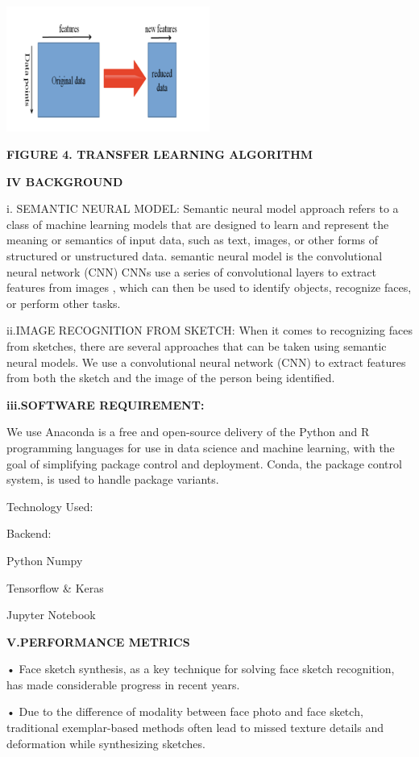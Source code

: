 \documentclass[journal]{IEEEtran} %
\begin{document}
\includegraphics[width=0.5\textwidth]{alg.png}

\textbf\textbf{{\textbf{FIGURE 4. TRANSFER LEARNING ALGORITHM}}
}

\textbf{IV BACKGROUND}

i. SEMANTIC NEURAL MODEL:
Semantic neural model approach refers to a class of machine learning models that are designed to learn and represent the meaning or semantics of input data, such as text, images, or other forms of structured or unstructured data. 
semantic neural model is the convolutional neural network (CNN)  
CNNs use a series of convolutional layers to extract features from images , which can then be used to identify objects, recognize faces, or perform other tasks.

ii.IMAGE RECOGNITION FROM SKETCH:
When it comes to recognizing faces from sketches, there are several approaches that can be taken using semantic neural models. 
We use a convolutional neural network (CNN) to extract features from both the sketch and the image of the person being identified.

\textbf{iii.SOFTWARE REQUIREMENT:}

We use Anaconda is a free and open-source delivery of the Python and R programming languages for use in data science and machine learning, with the goal of simplifying package control and deployment. Conda, the package control system, is used to handle package variants.

Technology Used:

Backend:

Python
Numpy

Tensorflow & Keras

Jupyter Notebook

\textbf{V.PERFORMANCE METRICS}

•	Face sketch synthesis, as a key technique for solving face sketch recognition, has made considerable progress in recent years. 

•	Due to the difference of modality between face photo and face sketch, traditional exemplar-based methods often lead to missed texture details and deformation while synthesizing sketches. 
\end{document}
